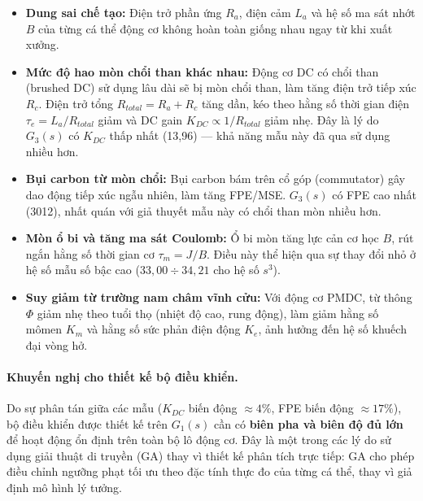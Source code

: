 \begin{itemize}
    \item \textbf{Dung sai chế tạo:} Điện trở phần ứng $R_a$, điện cảm $L_a$ và
    hệ số ma sát nhớt $B$ của từng cá thể động cơ không hoàn toàn giống nhau
    ngay từ khi xuất xưởng.

    \item \textbf{Mức độ hao mòn chổi than khác nhau:}
    Động cơ DC có chổi than (brushed DC) sử dụng lâu dài sẽ bị mòn chổi than,
    làm tăng điện trở tiếp xúc $R_c$. Điện trở tổng $R_{total} = R_a + R_c$
    tăng dần, kéo theo hằng số thời gian điện $\tau_e = L_a/R_{total}$ giảm
    và DC gain $K_{DC} \propto 1/R_{total}$ giảm nhẹ. Đây là lý do $G_3(s)$
    có $K_{DC}$ thấp nhất (13,96) — khả năng mẫu này đã qua sử dụng nhiều hơn.

    \item \textbf{Bụi carbon từ mòn chổi:}
    Bụi carbon bám trên cổ góp (commutator) gây dao động tiếp xúc ngẫu nhiên,
    làm tăng FPE/MSE. $G_3(s)$ có FPE cao nhất (3012), nhất quán với giả thuyết
    mẫu này có chổi than mòn nhiều hơn.

    \item \textbf{Mòn ổ bi và tăng ma sát Coulomb:}
    Ổ bi mòn tăng lực cản cơ học $B$, rút ngắn hằng số thời gian cơ $\tau_m = J/B$.
    Điều này thể hiện qua sự thay đổi nhỏ ở hệ số mẫu số bậc cao
    ($33{,}00 \div 34{,}21$ cho hệ số $s^3$).

    \item \textbf{Suy giảm từ trường nam châm vĩnh cửu:}
    Với động cơ PMDC, từ thông $\Phi$ giảm nhẹ theo tuổi thọ (nhiệt độ cao,
    rung động), làm giảm hằng số mômen $K_m$ và hằng số sức phản điện động
    $K_e$, ảnh hưởng đến hệ số khuếch đại vòng hở.
\end{itemize}

\paragraph{Khuyến nghị cho thiết kế bộ điều khiển.}
Do sự phân tán giữa các mẫu ($K_{DC}$ biến động $\approx 4\%$, FPE biến động
$\approx 17\%$), bộ điều khiển được thiết kế trên $G_1(s)$ cần có \textbf{biên
pha và biên độ đủ lớn} để hoạt động ổn định trên toàn bộ lô động cơ.
Đây là một trong các lý do sử dụng giải thuật di truyền (GA) thay vì thiết kế
phân tích trực tiếp: GA cho phép điều chỉnh ngưỡng phạt tối ưu theo đặc tính
thực đo của từng cá thể, thay vì giả định mô hình lý tưởng.


